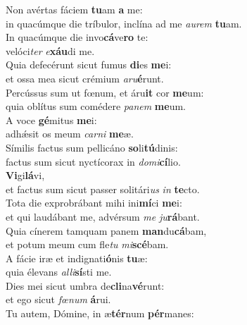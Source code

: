 \evenverse Non avértas fáciem \textbf{tu}am \textbf{a} me:~\*\\
\evenverse in quacúmque die tríbulor, inclína ad me \textit{au}\textit{rem} \textbf{tu}am.\\
\oddverse In quacúmque die invo\textbf{cá}ve\textbf{ro} te:~\*\\
\oddverse velóci\textit{ter} \textit{e}\textbf{xáu}di me.\\
\evenverse Quia defecérunt sicut fumus \textbf{di}es \textbf{me}i:~\*\\
\evenverse et ossa mea sicut crémium \textit{a}\textit{ru}\textbf{é}runt.\\
\oddverse Percússus sum ut fœnum, et áru\textbf{it} cor \textbf{me}um:~\*\\
\oddverse quia oblítus sum comédere \textit{pa}\textit{nem} \textbf{me}um.\\
\evenverse A voce \textbf{gé}mitus \textbf{me}i:~\*\\
\evenverse adhǽsit os meum \textit{car}\textit{ni} \textbf{me}æ.\\
\oddverse Símilis factus sum pellicáno \textbf{so}li\textbf{tú}dinis:~\*\\
\oddverse factus sum sicut nyctícorax in \textit{do}\textit{mi}\textbf{cí}lio.\\
\evenverse \textbf{Vi}gi\textbf{lá}vi,~\*\\
\evenverse et factus sum sicut passer solitári\textit{us} \textit{in} \textbf{te}cto.\\
\oddverse Tota die exprobrábant mihi ini\textbf{mí}ci \textbf{me}i:~\*\\
\oddverse et qui laudábant me, advérsum \textit{me} \textit{ju}\textbf{rá}bant.\\
\evenverse Quia cínerem tamquam panem \textbf{man}du\textbf{cá}bam,~\*\\
\evenverse et potum meum cum fle\textit{tu} \textit{mi}\textbf{scé}bam.\\
\oddverse A fácie iræ et indignati\textbf{ó}nis \textbf{tu}æ:~\*\\
\oddverse quia élevans \textit{al}\textit{li}\textbf{sí}sti me.\\
\evenverse Dies mei sicut umbra de\textbf{cli}na\textbf{vé}runt:~\*\\
\evenverse et ego sicut \textit{fœ}\textit{num} \textbf{á}rui.\\
\oddverse Tu autem, Dómine, in æ\textbf{tér}num \textbf{pér}manes:~\*\\
